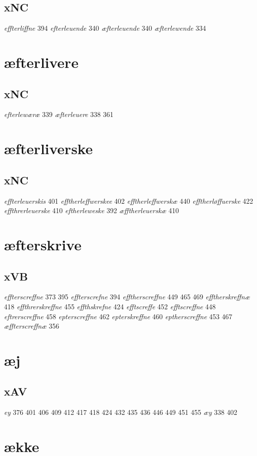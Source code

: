 \documentclass[a4paper,twocolumn]{article}
\begin{document}
\subsection{xNC}
\label{sec:org08ea4d2}
\emph{effterliffne} 394 \emph{efterleuende} 340 \emph{æfterleuende} 340 \emph{æfterlewende} 334 
\section{æfterlivere}
\label{sec:org8043c98}
\subsection{xNC}
\label{sec:org0208dea}
\emph{efterlewæræ} 339 \emph{æfterleuere} 338 361 
\section{æfterliverske}
\label{sec:org23f14c0}
\subsection{xNC}
\label{sec:org84dd8b6}
\emph{effterleuerskis} 401 \emph{efftherleffwerskee} 402 \emph{efftherleffwerskæ} 440 \emph{efftherløffuerske} 422 \emph{effthrerleuerske} 410 \emph{eftherleweske} 392 \emph{æfftherleuerskæ} 410 
\section{æfterskrive}
\label{sec:org2a28f2a}
\subsection{xVB}
\label{sec:org5793470}
\emph{effterscreffne} 373 395 \emph{effterscrefne} 394 \emph{efftherscreffne} 449 465 469 \emph{efftherskreffnæ} 418 \emph{effthrerskreffne} 455 \emph{effthskrefne} 424 \emph{efftscreffe} 452 \emph{efftscreffne} 448 \emph{eftrerscreffne} 458 \emph{epterscreffne} 462 \emph{epterskreffne} 460 \emph{eptherscreffne} 453 467 \emph{æffterscreffnæ} 356 
\section{æj}
\label{sec:org904597b}
\subsection{xAV}
\label{sec:orgae5f0ab}
\emph{ey} 376 401 406 409 412 417 418 424 432 435 436 446 449 451 455 \emph{æy} 338 402 
\section{ække}
\label{sec:org3caefff}
\end{document}
